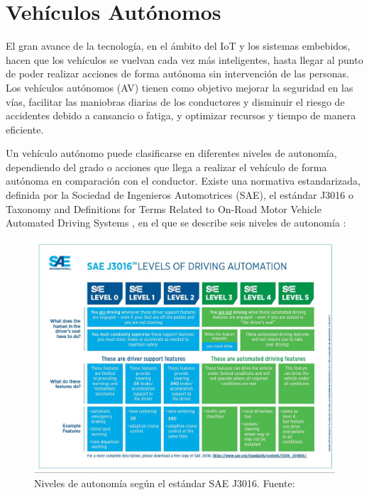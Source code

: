 \documentclass[12pt]{report} %
\begin{document}
\section{Vehículos Autónomos}

El gran avance de la tecnología, en el ámbito del IoT y los sistemas embebidos, hacen que los vehículos se vuelvan cada vez más inteligentes, hasta llegar al punto de poder realizar acciones de forma autónoma sin intervención de las personas. Los vehículos autónomos (AV) tienen como objetivo mejorar la seguridad en las vías, facilitar las maniobras diarias de los conductores y disminuir el riesgo de accidentes debido a cansancio o fatiga, y optimizar recursos y tiempo de manera eficiente.
\cite{autonomousVehicles2}

Un vehículo autónomo puede clasificarse en diferentes niveles de autonomía, dependiendo del grado o acciones que llega a realizar el vehículo de forma autónoma en comparación con el conductor. Existe una normativa estandarizada, definida por la Sociedad de Ingenieros Automotrices (SAE), el estándar J3016 o Taxonomy and Definitions for Terms Related to On-Road Motor Vehicle Automated Driving Systems \cite{sae}, en el que se describe seis niveles de autonomía 
\cite{autonomousVehicles}:

\begin{figure}[H]
	\centering
	\includegraphics[width=\textwidth]{saeLevels.jpg}
	\caption{Niveles de autonomía según el estándar SAE J3016. Fuente: \cite{autonomousVehicles}}
	\label{fig:imagen19}
\end{figure}
\end{document}
